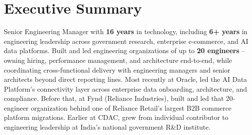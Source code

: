 \section{Executive Summary}
Senior Engineering Manager with \textbf{16 years} in technology, including \textbf{6+ years} in engineering leadership across government research,
enterprise e-commerce, and AI data platforms. Built and led engineering organizations of up to \textbf{20 engineers} – owning hiring,
performance management, and architecture end-to-end, while coordinating cross-functional delivery with engineering managers and senior
architects beyond direct reporting lines. Most recently at Oracle, led the AI Data Platform’s connectivity layer across enterprise data
onboarding, architecture, and compliance. Before that, at Fynd (Reliance Industries), built and led that 20-engineer organization behind
one of Reliance Retail’s largest B2B commerce platform migrations. Earlier at CDAC, grew from individual contributor to engineering
leadership at India’s national government R\&D institute.
